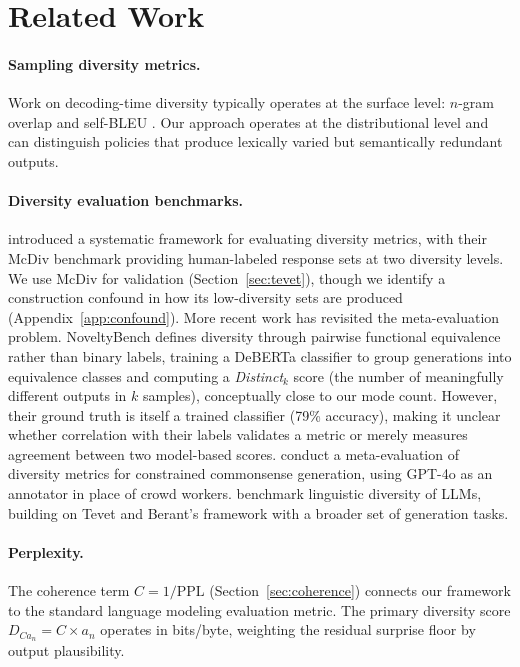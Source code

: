 \section{Related Work}\label{sec:related}

\paragraph{Sampling diversity metrics.} Work on decoding-time diversity typically operates at the surface level: $n$-gram overlap \citep{li2016diversity} and self-BLEU \citep{zhu2018texygen}.
Our approach operates at the distributional level and can distinguish policies that produce lexically varied but semantically redundant outputs.

\paragraph{Diversity evaluation benchmarks.}
\citet{tevet2020evaluating} introduced a systematic framework for evaluating diversity metrics, with their McDiv benchmark providing human-labeled response sets at two diversity levels.
We use McDiv for validation (Section~\ref{sec:tevet}), though we identify a construction confound in how its low-diversity sets are produced (Appendix~\ref{app:confound}).
More recent work has revisited the meta-evaluation problem.
NoveltyBench \citep{zhang2025noveltybench} defines diversity through pairwise functional equivalence rather than binary labels, training a DeBERTa classifier to group generations into equivalence classes and computing a \emph{Distinct}$_k$ score (the number of meaningfully different outputs in $k$ samples), conceptually close to our mode count.
However, their ground truth is itself a trained classifier (79\% accuracy), making it unclear whether correlation with their labels validates a metric or merely measures agreement between two model-based scores.
\citet{zhang2025commonsense} conduct a meta-evaluation of diversity metrics for constrained commonsense generation, using GPT-4o as an annotator in place of crowd workers.
\citet{guo2024linguistic} benchmark linguistic diversity of LLMs, building on Tevet and Berant's framework with a broader set of generation tasks.

\paragraph{Perplexity.} The coherence term $C = 1/\mathrm{PPL}$ (Section~\ref{sec:coherence}) connects our framework to the standard language modeling evaluation metric.
The primary diversity score $D_{Ca_n} = C \times a_n$ operates in bits/byte, weighting the residual surprise floor by output plausibility.

